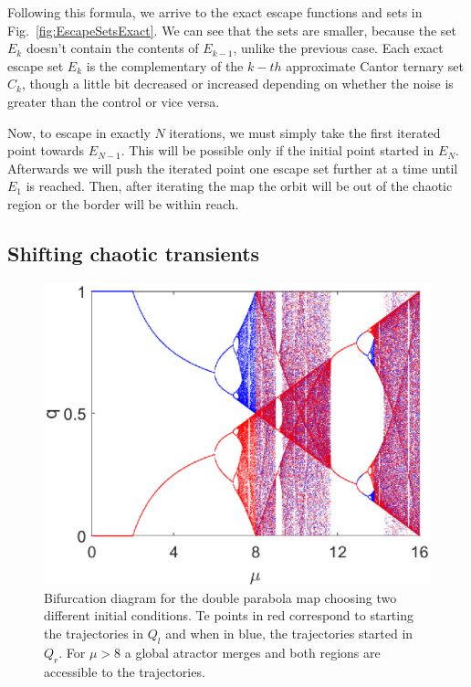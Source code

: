 Following this formula, we arrive to the exact escape functions and sets in Fig.~\ref{fig:EscapeSetsExact}. We can see that the sets are smaller, because the set $E_k$ doesn't contain the contents of $E_{k-1}$, unlike the previous case. Each exact escape set $E_k$ is the complementary of the $k-th$ approximate Cantor ternary set $C_k$, though a little bit decreased or increased depending on whether the noise is greater than the control or vice versa. 

Now, to escape in exactly $N$ iterations, we must simply take the first iterated point towards $E_{N-1}$. This will be possible only if the initial point started in $E_N$. Afterwards we will push the iterated point one escape set further at a time until $E_1$ is reached. Then, after iterating the map the orbit will be out of the chaotic region or the border will be within reach.




\subsection{Shifting chaotic transients}



\begin{figure}
	\centering
	\includegraphics[width=1\linewidth]{Images/P1/Alt_Bifurcation.eps}
	\caption{Bifurcation diagram for the double parabola map choosing two different initial conditions. Te points in red correspond to starting the trajectories in $Q_l$ and when in blue, the trajectories started in $Q_r$. For $\mu>8$ a global atractor merges and both regions are accessible to the trajectories.} 
	\label{fig:Alt_Bifurcation}
\end{figure}

